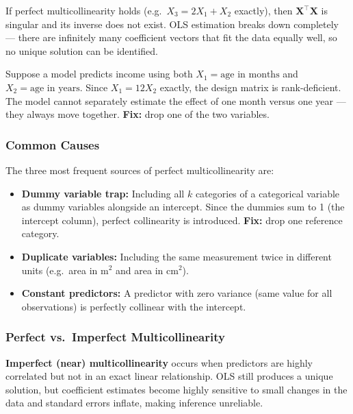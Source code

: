 \begin{remark}
If perfect multicollinearity holds (e.g.\ $X_3 = 2X_1 + X_2$ exactly), then $\mathbf{X}^\top\mathbf{X}$ is singular and its inverse does not exist. OLS estimation breaks down completely --- there are infinitely many coefficient vectors that fit the data equally well, so no unique solution can be identified.
\end{remark}

\begin{example}
Suppose a model predicts income using both $X_1 = \text{age in months}$ and $X_2 = \text{age in years}$. Since $X_1 = 12 X_2$ exactly, the design matrix is rank-deficient. The model cannot separately estimate the effect of one month versus one year --- they always move together. \textbf{Fix:} drop one of the two variables.
\end{example}

\subsubsection*{Common Causes}

\begin{remark}
The three most frequent sources of perfect multicollinearity are:
\begin{itemize}
    \item \textbf{Dummy variable trap:} Including all $k$ categories of a categorical variable as dummy variables alongside an intercept. Since the dummies sum to 1 (the intercept column), perfect collinearity is introduced. \textbf{Fix:} drop one reference category.
    \item \textbf{Duplicate variables:} Including the same measurement twice in different units (e.g.\ area in $\text{m}^2$ and area in $\text{cm}^2$).
    \item \textbf{Constant predictors:} A predictor with zero variance (same value for all observations) is perfectly collinear with the intercept.
\end{itemize}
\end{remark}

\subsubsection*{Perfect vs.\ Imperfect Multicollinearity}

\begin{definition}
\textbf{Imperfect (near) multicollinearity} occurs when predictors are highly correlated but not in an exact linear relationship. OLS still produces a unique solution, but coefficient estimates become highly sensitive to small changes in the data and standard errors inflate, making inference unreliable.
\end{definition}

